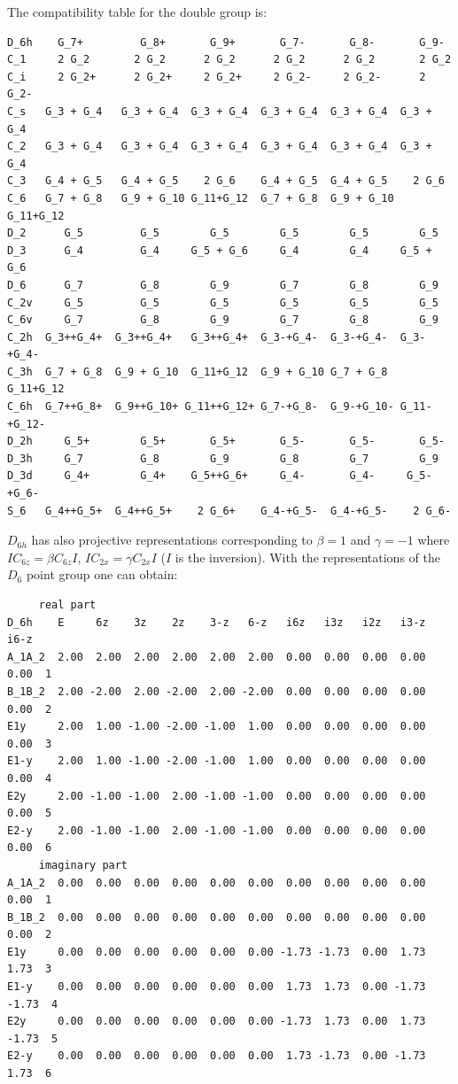 \documentclass[12pt,a4paper]{article}
\begin{document}
The compatibility table for the double group is:
\begin{verbatim}
D_6h    G_7+         G_8+       G_9+       G_7-       G_8-       G_9-
C_1     2 G_2       2 G_2      2 G_2      2 G_2      2 G_2       2 G_2
C_i     2 G_2+      2 G_2+     2 G_2+     2 G_2-     2 G_2-      2 G_2-
C_s   G_3 + G_4   G_3 + G_4  G_3 + G_4  G_3 + G_4  G_3 + G_4  G_3 + G_4
C_2   G_3 + G_4   G_3 + G_4  G_3 + G_4  G_3 + G_4  G_3 + G_4  G_3 + G_4
C_3   G_4 + G_5   G_4 + G_5    2 G_6    G_4 + G_5  G_4 + G_5    2 G_6
C_6   G_7 + G_8   G_9 + G_10 G_11+G_12  G_7 + G_8  G_9 + G_10 G_11+G_12
D_2      G_5         G_5        G_5        G_5        G_5        G_5
D_3      G_4         G_4     G_5 + G_6     G_4        G_4     G_5 + G_6    
D_6      G_7         G_8        G_9        G_7        G_8        G_9
C_2v     G_5         G_5        G_5        G_5        G_5        G_5
C_6v     G_7         G_8        G_9        G_7        G_8        G_9
C_2h  G_3++G_4+  G_3++G_4+   G_3++G_4+  G_3-+G_4-  G_3-+G_4-  G_3-+G_4- 
C_3h  G_7 + G_8  G_9 + G_10  G_11+G_12  G_9 + G_10 G_7 + G_8  G_11+G_12
C_6h  G_7++G_8+  G_9++G_10+ G_11++G_12+ G_7-+G_8-  G_9-+G_10- G_11-+G_12-
D_2h     G_5+        G_5+       G_5+       G_5-       G_5-       G_5-
D_3h     G_7         G_8        G_9        G_8        G_7        G_9
D_3d     G_4+        G_4+    G_5++G_6+     G_4-       G_4-     G_5-+G_6-
S_6   G_4++G_5+  G_4++G_5+    2 G_6+    G_4-+G_5-  G_4-+G_5-    2 G_6-
\end{verbatim}
$D_{6h}$ has also projective representations corresponding to
$\beta=1$ and $\gamma=-1$ where $IC_{6z} = \beta C_{6z} I$, 
$IC_{2x} = \gamma C_{2x} I$ ($I$ is the inversion). With the 
representations of the $D_6$ point group one can obtain:
\begin{verbatim}
     real part
D_6h    E     6z    3z    2z    3-z   6-z   i6z   i3z   i2z   i3-z   i6-z
A_1A_2  2.00  2.00  2.00  2.00  2.00  2.00  0.00  0.00  0.00  0.00   0.00  1
B_1B_2  2.00 -2.00  2.00 -2.00  2.00 -2.00  0.00  0.00  0.00  0.00   0.00  2
E1y     2.00  1.00 -1.00 -2.00 -1.00  1.00  0.00  0.00  0.00  0.00   0.00  3
E1-y    2.00  1.00 -1.00 -2.00 -1.00  1.00  0.00  0.00  0.00  0.00   0.00  4
E2y     2.00 -1.00 -1.00  2.00 -1.00 -1.00  0.00  0.00  0.00  0.00   0.00  5
E2-y    2.00 -1.00 -1.00  2.00 -1.00 -1.00  0.00  0.00  0.00  0.00   0.00  6
     imaginary part
A_1A_2  0.00  0.00  0.00  0.00  0.00  0.00  0.00  0.00  0.00  0.00   0.00  1
B_1B_2  0.00  0.00  0.00  0.00  0.00  0.00  0.00  0.00  0.00  0.00   0.00  2
E1y     0.00  0.00  0.00  0.00  0.00  0.00 -1.73 -1.73  0.00  1.73   1.73  3
E1-y    0.00  0.00  0.00  0.00  0.00  0.00  1.73  1.73  0.00 -1.73  -1.73  4
E2y     0.00  0.00  0.00  0.00  0.00  0.00 -1.73  1.73  0.00  1.73  -1.73  5
E2-y    0.00  0.00  0.00  0.00  0.00  0.00  1.73 -1.73  0.00 -1.73   1.73  6
\end{verbatim}
\end{document}
